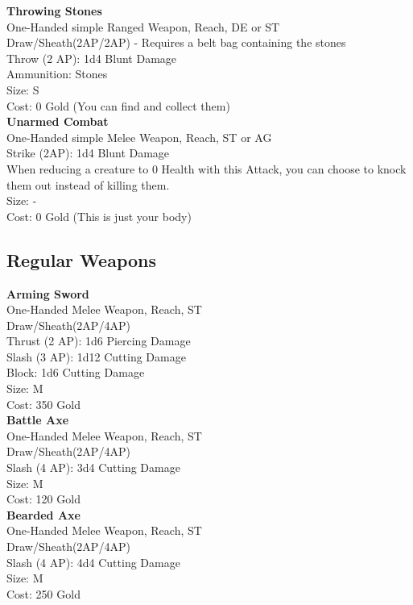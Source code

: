 \textbf{Throwing Stones}\label{weapon:throwingStones}\\
One-Handed simple Ranged Weapon,  Reach, DE or ST\\
Draw/Sheath(2AP/2AP) - Requires a belt bag containing the stones\\
Throw (2 AP): 1d4 Blunt Damage\\
Ammunition: Stones\\
Size: S\\
Cost: 0 Gold (You can find and collect them)\\

\textbf{Unarmed Combat}\label{weapon:unarmedCombat}\\
One-Handed simple Melee Weapon,  Reach, ST or AG\\
Strike (2AP): 1d4 Blunt Damage\\
When reducing a creature to 0 Health with this Attack, you can choose to knock them out instead of killing them.\\
Size: -\\
Cost: 0 Gold (This is just your body)\\


\subsection{Regular Weapons}\label{subsec:regularWeapons}
\textbf{Arming Sword}\label{weapon:armingSword}\\
One-Handed Melee Weapon,  Reach, ST\\
Draw/Sheath(2AP/4AP)\\
Thrust (2 AP): 1d6 Piercing Damage\\
Slash (3 AP): 1d12 Cutting Damage\\
Block: 1d6 Cutting Damage\\
Size: M\\
Cost: 350 Gold\\

\textbf{Battle Axe}\label{weapon:battleAxe}\\
One-Handed Melee Weapon,  Reach, ST\\
Draw/Sheath(2AP/4AP)\\
Slash (4 AP): 3d4 Cutting Damage\\
Size: M\\
Cost: 120 Gold\\

\textbf{Bearded Axe}\label{weapon:beardedAxe}\\
One-Handed Melee Weapon,  Reach, ST\\
Draw/Sheath(2AP/4AP)\\
Slash (4 AP): 4d4 Cutting Damage\\
Size: M\\
Cost: 250 Gold\\

